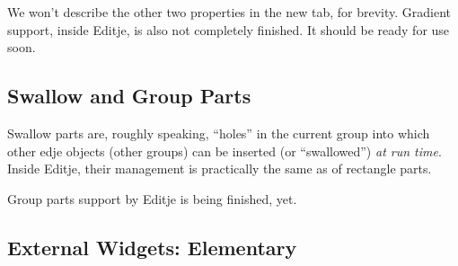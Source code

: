 \documentclass[a4paper]{profusion}
\newcommand{\GUIButton}[1]{\textcolor{green}{#1}} %
\begin{document}





We won't describe the other two properties in the new tab, for
brevity. Gradient support, inside Editje, is also not completely
finished. It should be ready for use soon.

\subsection{Swallow and Group Parts}

Swallow parts are, roughly speaking, ``holes'' in the current group
into which other edje objects (other groups) can be inserted (or
``swallowed'') \emph{at run time}. Inside Editje, their management is
practically the same as of rectangle parts.

Group parts support by Editje is being finished, yet.

\subsection{External Widgets: Elementary}
\end{document}
